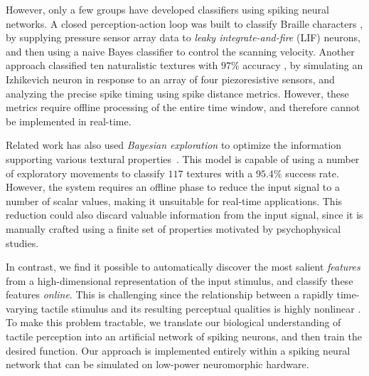 
However, only a few groups have developed classifiers using spiking neural networks. A closed perception-action loop was built to classify Braille characters \citep{bologna2013closed}, by supplying pressure sensor array data to {\it leaky integrate-and-fire} (LIF) 
neurons, and then using a naive Bayes classifier to control the scanning velocity. 
Another approach classified ten naturalistic textures with $97\%$ accuracy \citep{rongala2015neuromorphic}, by simulating an Izhikevich neuron in response to an array of four piezoresistive sensors, and analyzing the precise spike timing using spike distance metrics. However, these metrics require offline processing of the entire time window, and therefore cannot be implemented in real-time.

Related work has also used {\it Bayesian exploration} to optimize the information supporting various textural \mbox{properties \citep{fishel2012bayesian}}. This model is capable of using a number of exploratory movements to classify $117$ textures with a $95.4\%$ success rate. However, the system requires an offline phase to reduce the input signal to a number of scalar values, making it unsuitable for real-time applications. This reduction could also discard valuable information from the input signal, since it is manually crafted using a finite set of properties motivated by psychophysical studies. 

In contrast, we find it possible to automatically discover the most salient {\it features} from a high-dimensional representation of the input stimulus, %
and classify these features {\it online}.  This is challenging since the relationship between a rapidly time-varying tactile stimulus and its resulting perceptual qualities is highly nonlinear \citep{weber2013spatial}. To make this problem tractable, we translate our biological understanding of tactile perception into an artificial network  of spiking neurons, and then train the desired function. Our approach  %
is implemented entirely within a spiking neural network that can be simulated on low-power neuromorphic hardware. 

%

